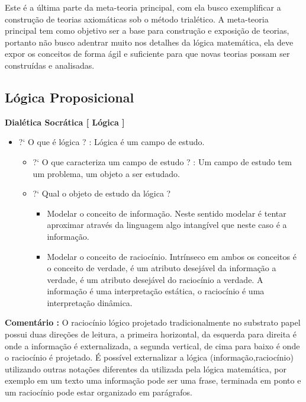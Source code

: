 \documentclass[10pt,a4paper]{report}
\begin{document}
Este é a última parte da meta-teoria principal, com ela busco exemplificar a construção de teorias axiomáticas sob o método trialético. A meta-teoria principal tem como objetivo ser a base para construção e exposição de teorias, portanto não busco adentrar muito nos detalhes da lógica matemática, ela deve expor os conceitos de forma ágil e suficiente para que novas teorias possam ser construídas e analisadas.

\subsection{Lógica Proposicional}


\hspace{\baselineskip}

\textbf{Dialética Socrática [ Lógica ]}

\begin{itemize}
	\item[ ] ?` O que é lógica ? : Lógica é um campo de estudo.
	\begin{itemize}
		\item[ ] ?` O que caracteriza um campo de estudo ? : Um campo de estudo tem um problema, um objeto a ser estudado.
		\item[ ] ?` Qual o objeto de estudo da lógica ?
		\begin{itemize}
			\item[ (i) ] Modelar o conceito de informação. Neste sentido modelar é tentar aproximar através da linguagem algo intangível que neste caso é a informação.
			\item[ (ii) ] Modelar o conceito de raciocínio. Intrínseco em ambos os conceitos é o conceito de verdade, é um atributo desejável da informação a verdade, é um atributo desejável do raciocínio a verdade. A informação é uma interpretação estática, o raciocínio é uma interpretação dinâmica.
		\end{itemize}
	\end{itemize}
	
\end{itemize}

\textbf{Comentário :} O raciocínio lógico projetado tradicionalmente no substrato papel possui duas direções de leitura, a primeira horizontal, da esquerda para direita é onde a informação é externalizada, a segunda vertical, de cima para baixo é onde o raciocínio é projetado. É possível externalizar a lógica (informação,raciocínio) utilizando outras notações diferentes da utilizada pela lógica matemática, por exemplo em um texto uma informação pode ser uma frase, terminada em ponto e um raciocínio pode estar organizado em parágrafos.\\
\end{document}
